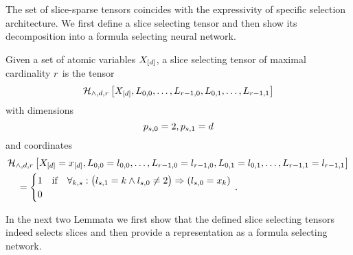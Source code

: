 %








The set of slice-sparse tensors coincides with the expressivity of specific selection architecture.
We first define a slice selecting tensor and then show its decomposition into a formula selecting neural network.

\begin{definition}
	Given a set of atomic variables $X_{[d]}$, a slice selecting tensor of maximal cardinality $r$ is the tensor
		\[ \mathcal{H}_{\land,d,r}\left[X_{[d]},L_{0,0},\ldots,L_{r-1,0},L_{0,1},\ldots,L_{r-1,1}\right] \]
	with dimensions
		\[ p_{s,0} = 2, p_{s,1} = d \]
	and coordinates
	\begin{align*}
		& \mathcal{H}_{\land,d,r}\left[X_{[d]}=x_{[d]},L_{0,0}=l_{0,0},\ldots,L_{r-1,0}=l_{r-1,0},L_{0,1}=l_{0,1},\ldots,L_{r-1,1}=l_{r-1,1}\right] \\
		& \quad = \begin{cases}
			1 & \text{if} \quad 
			\forall_{k,s} : \big(  l_{s,1} = k \land l_{s,0} \neq 2 \big) \Rightarrow  (l_{s,0} = x_{k})  \\
			0
		\end{cases} \, . 
	\end{align*}
\end{definition}

In the next two Lemmata we first show that the defined slice selecting tensors indeed selects slices and then provide a representation as a formula selecting network.

